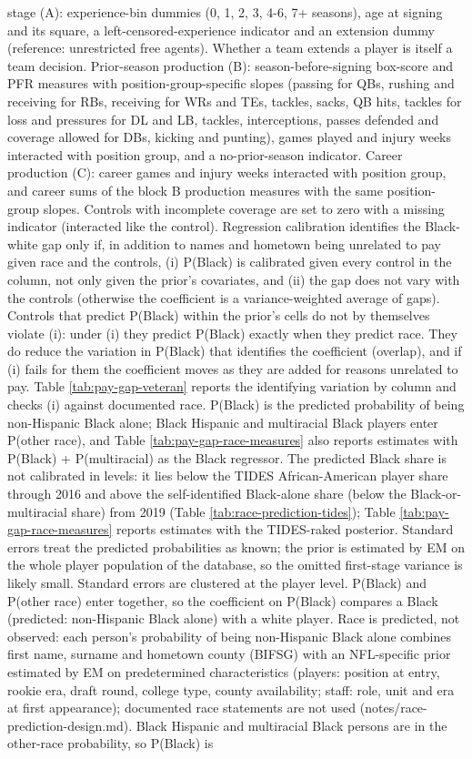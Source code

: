 {stage (A): experience-bin dummies (0, 1, 2, 3, 4-6, 7+ seasons), age at signing and its square, a left-censored-experience indicator and an extension dummy (reference: unrestricted free agents). Whether a team extends a player is itself a team decision. Prior-season production (B): season-before-signing box-score and PFR measures with position-group-specific slopes (passing for QBs, rushing and receiving for RBs, receiving for WRs and TEs, tackles, sacks, QB hits, tackles for loss and pressures for DL and LB, tackles, interceptions, passes defended and coverage allowed for DBs, kicking and punting), games played and injury weeks interacted with position group, and a no-prior-season indicator. Career production (C): career games and injury weeks interacted with position group, and career sums of the block B production measures with the same position-group slopes. Controls with incomplete coverage are set to zero with a missing indicator (interacted like the control). Regression calibration identifies the Black-white gap only if, in addition to names and hometown being unrelated to pay given race and the controls, (i) P(Black) is calibrated given every control in the column, not only given the prior's covariates, and (ii) the gap does not vary with the controls (otherwise the coefficient is a variance-weighted average of gaps). Controls that predict P(Black) within the prior's cells do not by themselves violate (i): under (i) they predict P(Black) exactly when they predict race. They do reduce the variation in P(Black) that identifies the coefficient (overlap), and if (i) fails for them the coefficient moves as they are added for reasons unrelated to pay. Table \ref{tab:pay-gap-veteran} reports the identifying variation by column and checks (i) against documented race. P(Black) is the predicted probability of being non-Hispanic Black alone; Black Hispanic and multiracial Black players enter P(other race), and Table \ref{tab:pay-gap-race-measures} also reports estimates with P(Black) + P(multiracial) as the Black regressor. The predicted Black share is not calibrated in levels: it lies below the TIDES African-American player share through 2016 and above the self-identified Black-alone share (below the Black-or-multiracial share) from 2019 (Table \ref{tab:race-prediction-tides}); Table \ref{tab:pay-gap-race-measures} reports estimates with the TIDES-raked posterior. Standard errors treat the predicted probabilities as known; the prior is estimated by EM on the whole player population of the database, so the omitted first-stage variance is likely small. Standard errors are clustered at the player level. P(Black) and P(other race) enter together, so the coefficient on P(Black) compares a Black (predicted: non-Hispanic Black alone) with a white player. Race is predicted, not observed: each person's probability of being non-Hispanic Black alone combines first name, surname and hometown county (BIFSG) with an NFL-specific prior estimated by EM on predetermined characteristics (players: position at entry, rookie era, draft round, college type, county availability; staff: role, unit and era at first appearance); documented race statements are not used (notes/race-prediction-design.md). Black Hispanic and multiracial Black persons are in the other-race probability, so P(Black) is }
